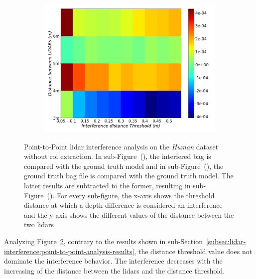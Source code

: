\begin{figure}[!ht]
	\begin{subfigure}[c]{0.6\textwidth}
		\centering
		\includegraphics[width=\textwidth]{img/lidar-interference/human/difference_ground_truth_interference_measurement.png}
		\caption{}
		\label{fig:human:difference-color-mesh}
	\end{subfigure}

	\caption[Point-to-Point analysis of the interference on the \textit{Human} dataset without \ac{roi} extraction. Results are presented for the ground-truth bag, interference bag and the subtraction of the results between the two.]{Point-to-Point \ac{lidar} interference analysis on the \textit{Human} dataset without \ac{roi} extraction. In sub-Figure~(), the interfered bag is compared with the ground truth model and in sub-Figure~(), the ground truth bag file is compared with the ground truth model. The latter results are subtracted to the former, resulting in sub-Figure~(). For every sub-figure, the x-axis shows the threshold distance at which a depth difference is considered an interference and the y-axis shows the different values of the distance between the two \acp{lidar}} 
	\label{fig:human:color-mesh}
\end{figure}

Analyzing Figure~\ref{fig:human:color-mesh}, contrary to the results shown in sub-Section~\ref{subsec:lidar-interference:point-to-point-analysis-results}, the distance threshold value does not dominate the interference behavior. The interference decreases with the increasing of the distance between the \acp{lidar} and the distance threshold.

